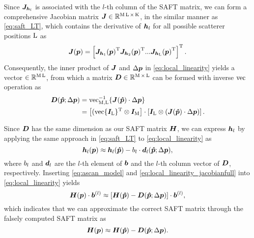 Since $\bm{J}_{\bm{h}_{l}}$ is associated with the $l$-th column of the SAFT matrix, we can form a comprehensive Jacobian matrix $\bm{J} \in {\mathbb{R}}^{\operatorname{M} \operatorname{L} \times \operatorname{K}}$, in the similar manner as \eqref{eq:saft_LT}, which contains the derivative of $\bm{h}_{l}$ for all possible scatterer positions $\operatorname{L}$ as
\begin{equation} \label{eq:jacobian_full}
\Jacobian (\pp) = \left[ {\Jacobian_{\pulsevec_{1}} (\pp) }^{\T} {\Jacobian_{\pulsevec_{2}} (\pp)}^{\T}  \text{...} {\Jacobian_{\pulsevec_{\LL}} (\pp)}^{\T}  \right]^{\T}.
\end{equation} 
%
Consequently, the inner product of $\bm{J}$ and $\Delta \bm{p}$ in \eqref{eq:local_linearity} yields a vector $\in {\mathbb{R}}^{\operatorname{M} \operatorname{L}}$, from which a matrix $\bm{D} \in {\mathbb{R}}^{\operatorname{M} \times \operatorname{L}}$ can be formed with inverse $\operatorname{vec}$ operation as 
\begin{equation} \label{eq:deriv_matrix}
\begin{split}
\Deriv (\pphat ; \ppdelta) &= \vectorize^{-1}_{\M, \LL} \{ \Jacobian (\pphat) \cdot \ppdelta \} \\
                                           &= \left[ (\vectorize \{ \Identity_{\LL} \}^{\T} \otimes \Identity_{\M} \right] \cdot \left[ \Identity_{\LL} \otimes ( \Jacobian (\pphat)\cdot \ppdelta ) \right].
\end{split}
\end{equation}\par

Since $\bm{D}$ has the same dimension as our SAFT matrix $\bm{H}$, we can express $\bm{h}_{l}$ by applying the same approach in \eqref{eq:saft_LT} to \eqref{eq:local_linearity} as 
\begin{equation} \label{eq:local_linearity_jacobianfull}
\SAFTcol (\pp) \approx \SAFTcol (\pphat) - \defectsingle_{l} \cdot \Derivcol (\pphat; \ppdelta),
\end{equation}
where $b_{l}$ and $\bm{d}_{l}$ are the $l$-th element of $\bm{b}$ and the $l$-th column vector of $\bm{D}$, respectively.
%
Inserting \eqref{eq:ascan_model} and \eqref{eq:local_linearity_jacobianfull} into \eqref{eq:local_linearity} yields
\begin{equation}
\bm{H} (\bm{p}) \cdot \bm{b}^{(l)} \approx \left[ \bm{H} (\bm{\hat{p}}) - \bm{D} (\bm{\hat{p}} ; \Delta \bm{p} ) \right] \cdot \bm{b}^{(l)},
\end{equation}
which indicates that we can approximate the correct SAFT matrix through the falsely computed SAFT matrix as
\begin{equation} \label{eq:saft_approx}
\SAFTp \approx \SAFTphat - \Deriv (\pphat ; \ppdelta ).
\end{equation} \par
%


